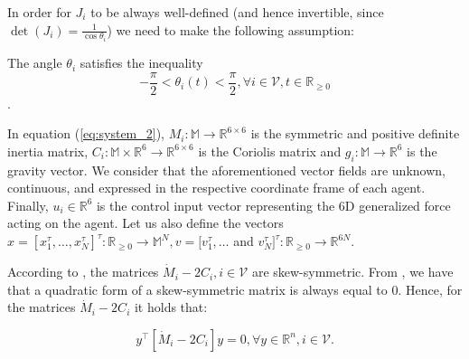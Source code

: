 In order for $J_i$ to be always well-defined (and hence invertible, since
$\det(J_i) = \tfrac{1}{\cos\theta_i}$) we need to make the following assumption:

\begin{assumption} \label{as:J}
	The angle $\theta_i$ satisfies the inequality
  $$-\frac{\pi}{2} < \theta_i(t) < \frac{\pi}{2} ,\forall i\in\mathcal{V},t\in\mathbb{R}_{\geq 0}$$.
\end{assumption}

In equation (\ref{eq:system_2}), $M_i:\mathbb{M} \to \mathbb{R}^{6\times6}$ is
the symmetric and positive definite inertia matrix,
$C_i:\mathbb{M}\times\mathbb{R}^6 \to \mathbb{R}^{6\times6}$ is the Coriolis
matrix and $g_i:\mathbb{M} \to \mathbb{R}^6$ is the gravity vector.
We consider that the aforementioned vector fields are unknown, continuous,
and expressed in the respective coordinate frame of each agent.
Finally, $u_i\in\mathbb{R}^6$ is the control input vector representing the $6$D
generalized force acting on the agent. Let us also define the vectors
$x = [x_1^\tau,\dots,x_N^\tau]^\tau : \mathbb{R}_{\geq 0} \to \mathbb{M}^N, v = [v_1^\tau, \dots$
and $v_N^\tau]^\tau : \mathbb{R}_{\geq 0} \to \mathbb{R}^{6N}$.

\begin{remark}
	According to \cite{Siciliano2009}, the matrices
  $\dot{M}_i - 2C_i, i \in \mathcal{V}$ are skew-symmetric.
  From \cite{horn_jonshon}, we have that a quadratic form of a skew-symmetric
  matrix is always equal to $0$. Hence, for the matrices $\dot{M}_i - 2C_i$ it
  holds that:

	\begin{equation} \label{eq:skew_symm}
	y^\top \left[\dot{M}_i - 2 C_i\right]y = 0, \forall y \in \mathbb{R}^n, i \in \mathcal{V}.
	\end{equation}

\end{remark}

